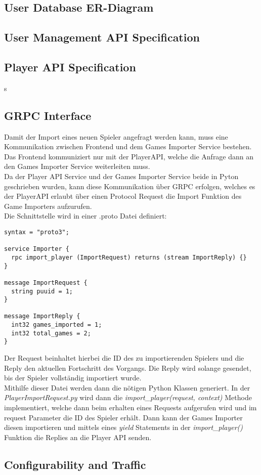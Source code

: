 \subsection{User Database ER-Diagram}

\subsection{User Management API Specification}

\subsection{Player API Specification}s

\subsection{GRPC Interface}
Damit der Import eines neuen Spieler angefragt werden kann, muss eine Kommunikation zwischen Frontend und dem Games Importer Service bestehen. Das Frontend kommuniziert nur mit der PlayerAPI, welche die Anfrage dann an den Games Importer Service weiterleiten muss.\\
Da der Player API Service und der Games Importer Service beide in Pyton geschrieben wurden, kann diese Kommunikation über GRPC erfolgen, welches es der PlayerAPI erlaubt über einen Protocol Request die Import Funktion des Game Importers aufzurufen.\\ %
Die Schnittstelle wird in einer .proto Datei definiert:

\begin{lstlisting}
syntax = "proto3";

service Importer {
  rpc import_player (ImportRequest) returns (stream ImportReply) {}
}

message ImportRequest {
  string puuid = 1;
}

message ImportReply {
  int32 games_imported = 1;
  int32 total_games = 2;
}
\end{lstlisting}
Der Request beinhaltet hierbei die ID des zu importierenden Spielers und die Reply den aktuellen Fortschritt des Vorgangs. Die Reply wird solange gesendet, bis der Spieler vollständig importiert wurde.\\
Mithilfe dieser Datei werden dann die nötigen Python Klassen generiert. In der \textit{PlayerImportRequest.py} wird dann die \textit{import\_player(request, context)} Methode implementiert, welche dann beim erhalten eines Requests aufgerufen wird und im request Parameter die ID des Spieler erhält. Dann kann der Games Importer diesen importieren und mittels eines \textit{yield} Statements in der \textit{import\_player()} Funktion die Replies an die Player API senden.

\subsection{Configurability and Traffic}